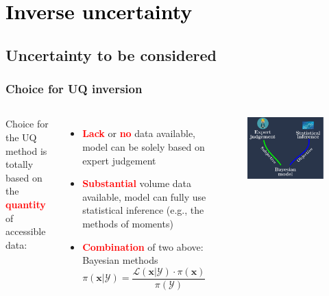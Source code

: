 
\section{\textcolor{black}{Inverse uncertainty}}
\subsection{Uncertainty to be considered}

\begin{frame}
\frametitle{Choice for UQ inversion}
\begin{columns}
        Choice for the UQ method is totally based on the {\textcolor{red}{\textbf{quantity}}} of accessible data:
        \begin{itemize}
            \item  {\textcolor{red}{\textbf{Lack}}} or {\textcolor{red}{\textbf{no}}} data available, model can be solely based on expert judgement
            \item {\textcolor{red}{\textbf{Substantial}}} volume data available, model can fully use statistical inference (e.g., the methods of moments)
            \item {\textcolor{red}{\textbf{Combination}}} of two above: Bayesian methods
            \begin{equation*}           \pi(\boldsymbol{x}|\mathcal{Y}) = \frac{{\mathcal{L}(\boldsymbol{x}|\mathcal{Y}) \cdot \pi(\boldsymbol{x})}}{{\pi(\mathcal{Y})}} 
            \end{equation*}
        \end{itemize}
    
        \begin{figure}[!ht]       \includegraphics[scale=0.6]{figures/figure_objvssub.pdf}
        \end{figure}
\end{columns}
    
\end{frame}
